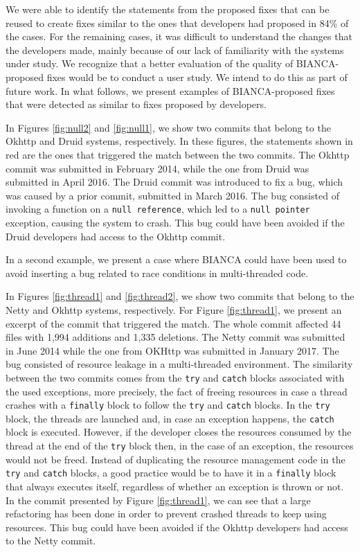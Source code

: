 \documentclass[12pt]{report}
\begin{document}
We were able to identify the statements from the proposed fixes that can
be reused to create fixes similar to the ones that developers had
proposed in 84\% of the cases. For the remaining cases, it was difficult
to understand the changes that the developers made, mainly because of
our lack of familiarity with the systems under study. We recognize that
a better evaluation of the quality of BIANCA-proposed fixes would be to
conduct a user study. We intend to do this as part of future work. In
what follows, we present examples of BIANCA-proposed fixes that were
detected as similar to fixes proposed by developers.



In Figures \ref{fig:null2} and \ref{fig:null1}, we show two commits that
belong to the Okhttp and Druid systems, respectively. In these figures,
the statements shown in red are the ones that triggered the match
between the two commits. The Okhttp commit was submitted in February
2014, while the one from Druid was submitted in April 2016. The Druid
commit was introduced to fix a bug, which was caused by a prior commit,
submitted in March 2016. The bug consisted of invoking a function on a
\lstinline!null reference!, which led to a \lstinline!null pointer!
exception, causing the system to crash. This bug could have been avoided
if the Druid developers had access to the Okhttp commit.

In a second example, we present a case where BIANCA could have been used
to avoid inserting a bug related to race conditions in multi-threaded
code.



In Figures \ref{fig:thread1} and \ref{fig:thread2}, we show two commits
that belong to the Netty and Okhttp systems, respectively. For Figure
\ref{fig:thread1}, we present an excerpt of the commit that triggered
the match. The whole commit affected 44 files with 1,994 additions and
1,335 deletions. The Netty commit was submitted in June 2014 while the
one from OKHttp was submitted in January 2017. The bug consisted of
resource leakage in a multi-threaded environment. The similarity between
the two commits comes from the \texttt{try} and \texttt{catch} blocks
associated with the used exceptions, more precisely, the fact of freeing
resources in case a thread crashes with a \texttt{finally} block to
follow the \texttt{try} and \texttt{catch} blocks. In the \texttt{try}
block, the threads are launched and, in case an exception happens, the
\texttt{catch} block is executed. However, if the developer closes the
resources consumed by the thread at the end of the \texttt{try} block
then, in the case of an exception, the resources would not be freed.
Instead of duplicating the resource management code in the \texttt{try}
and \texttt{catch} blocks, a good practice would be to have it in a
\texttt{finally} block that always executes itself, regardless of
whether an exception is thrown or not. In the commit presented by Figure
\ref{fig:thread1}, we can see that a large refactoring has been done in
order to prevent crashed threads to keep using resources. This bug could
have been avoided if the Okhttp developers had access to the Netty
commit.
\end{document}
